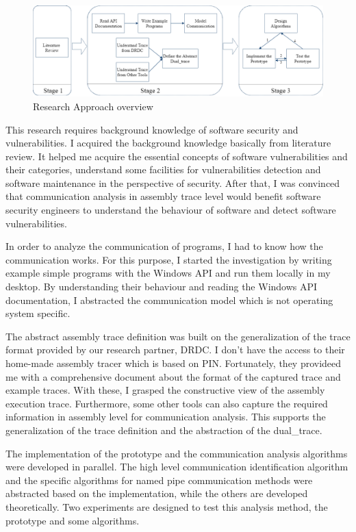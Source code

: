 \begin{figure}[H]
  \centerline{\includegraphics[scale=0.44]{Figures/methodology}}
  \caption{Research Approach overview}
  \label{methodology}
  \end{figure}

This research requires background knowledge of software security and vulnerabilities. I acquired the background knowledge basically from literature review. It helped me acquire the essential concepts of software vulnerabilities and their categories, understand some facilities for vulnerabilities detection and software maintenance in the perspective of security. After that, I was convinced that communication analysis in assembly trace level would benefit software security engineers to understand the behaviour of software and detect software vulnerabilities. 

In order to analyze the communication of programs, I had to know how the communication works. For this purpose, I started the investigation by writing example simple programs with the Windows API and run them locally in my desktop. By understanding their behaviour and reading the Windows API documentation, I abstracted the communication model which is not operating system specific.

The abstract assembly trace definition was built on the generalization of the trace format provided by our research partner, DRDC. I don't have the access to their home-made assembly tracer which is based on PIN\cite{_pin_????}. Fortunately, they provideed me with a comprehensive document about the format of the captured trace and example traces. With these, I grasped the constructive view of the assembly execution trace. Furthermore, some other tools can also capture the required information in assembly level for communication analysis. This supports the generalization of the trace definition and the abstraction of the dual\_trace.

The implementation of the prototype and the communication analysis algorithms were developed in parallel. The high level communication identification algorithm and the specific algorithms for named pipe communication methods were abstracted based on the implementation, while the others are developed theoretically. Two experiments are designed to test this analysis method, the prototype and some algorithms. 


